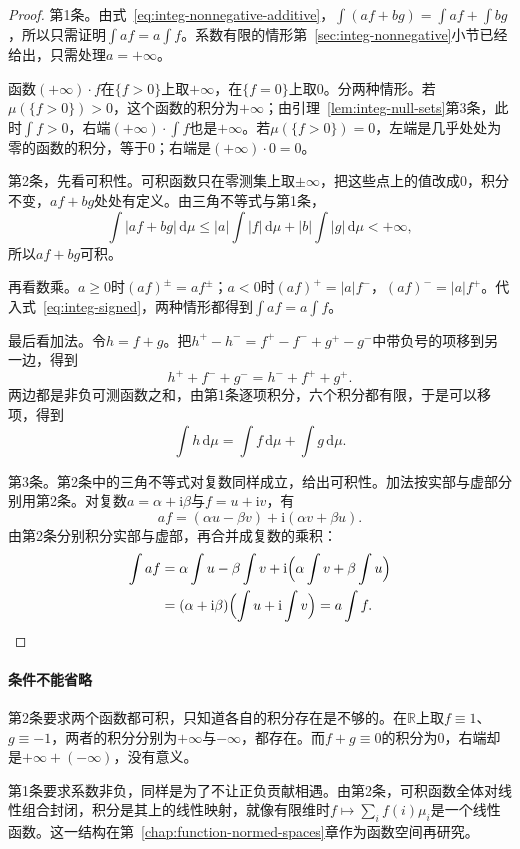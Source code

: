 \begin{proof}
第1条。由式~\eqref{eq:integ-nonnegative-additive}，$\int(af+bg)=\int af+\int bg$，所以只需证明$\int af=a\int f$。系数有限的情形第~\ref{sec:integ-nonnegative}小节已经给出，只需处理$a=+\infty$。

函数$(+\infty)\cdot f$在$\{f>0\}$上取$+\infty$，在$\{f=0\}$上取$0$。分两种情形。若$\mu(\{f>0\})>0$，这个函数的积分为$+\infty$；由引理~\ref{lem:integ-null-sets}第3条，此时$\int f>0$，右端$(+\infty)\cdot\int f$也是$+\infty$。若$\mu(\{f>0\})=0$，左端是几乎处处为零的函数的积分，等于$0$；右端是$(+\infty)\cdot0=0$。

第2条，先看可积性。可积函数只在零测集上取$\pm\infty$，把这些点上的值改成$0$，积分不变，$af+bg$处处有定义。由三角不等式与第1条，
\[
 \int\lvert af+bg\rvert\,\mathrm d\mu\leq\lvert a\rvert\int\lvert f\rvert\,\mathrm d\mu+\lvert b\rvert\int\lvert g\rvert\,\mathrm d\mu<+\infty,
\]
所以$af+bg$可积。

再看数乘。$a\geq0$时$(af)^\pm=af^\pm$；$a<0$时$(af)^+=\lvert a\rvert f^-$，$(af)^-=\lvert a\rvert f^+$。代入式~\eqref{eq:integ-signed}，两种情形都得到$\int af=a\int f$。

最后看加法。令$h=f+g$。把$h^+-h^-=f^+-f^-+g^+-g^-$中带负号的项移到另一边，得到
\[
 h^++f^-+g^-=h^-+f^++g^+ .
\]
两边都是非负可测函数之和，由第1条逐项积分，六个积分都有限，于是可以移项，得到
\[
 \int h\,\mathrm d\mu=\int f\,\mathrm d\mu+\int g\,\mathrm d\mu .
\]

第3条。第2条中的三角不等式对复数同样成立，给出可积性。加法按实部与虚部分别用第2条。对复数$a=\alpha+\mathrm i\beta$与$f=u+\mathrm iv$，有
\[
 af=(\alpha u-\beta v)+\mathrm i(\alpha v+\beta u).
\]
由第2条分别积分实部与虚部，再合并成复数的乘积：
\[
\begin{aligned}
 \int af&=\alpha\int u-\beta\int v+\mathrm i\Bigl(\alpha\int v+\beta\int u\Bigr)\\
 &=(\alpha+\mathrm i\beta)\Bigl(\int u+\mathrm i\int v\Bigr)=a\int f.
\end{aligned}
\]
\end{proof}

\paragraph{条件不能省略}
第2条要求两个函数都可积，只知道各自的积分存在是不够的。在$\mathbb R$上取$f\equiv1$、$g\equiv-1$，两者的积分分别为$+\infty$与$-\infty$，都存在。而$f+g\equiv0$的积分为$0$，右端却是$+\infty+(-\infty)$，没有意义。

第1条要求系数非负，同样是为了不让正负贡献相遇。由第2条，可积函数全体对线性组合封闭，积分是其上的线性映射，就像有限维时$f\mapsto\sum_if(i)\mu_i$是一个线性函数。这一结构在第~\ref{chap:function-normed-spaces}章作为函数空间再研究。


